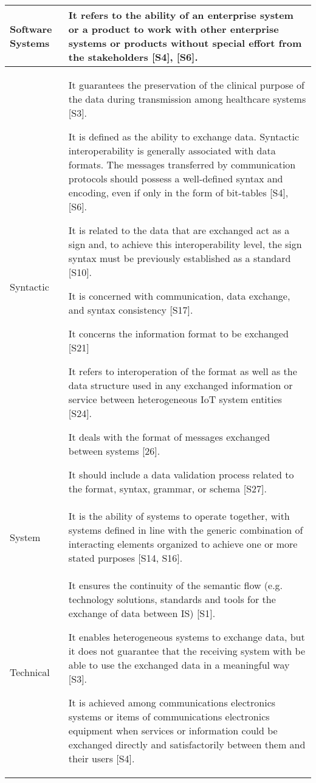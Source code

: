 \begin{longtable}{|p{2.3cm}|p{14cm}|}
    Software Systems & 
    It refers to the ability of an enterprise system or a product to work with other enterprise systems or products without special effort from the stakeholders [S4], [S6].
    \\\hline
    Syntactic & 
    
    It guarantees the preservation of the clinical purpose of the data during transmission among healthcare systems [S3].
    
    It is defined as the ability to exchange data. Syntactic interoperability is generally associated with data formats. The messages transferred by communication protocols should possess a well-defined syntax and encoding, even if only in the form of bit-tables [S4], [S6].
    
    It is related to the data that are exchanged act as a sign and, to achieve this interoperability level, the sign syntax must be previously established as a standard [S10]. 
    
    It is concerned with communication, data exchange, and syntax consistency [S17]. 
    
    It concerns the information format to be exchanged [S21]
    
    It refers to interoperation of the format as well as the data structure used in any exchanged information or service between heterogeneous IoT system entities [S24].
    
    It deals with the format of messages exchanged between systems [26]. 
    
    It should include a data validation process related to the format, syntax, grammar, or schema [S27].
    \\\hline
    System 
    &
    It is the ability of systems to operate together, with systems defined in line with the generic combination of interacting elements organized to achieve one or more stated purposes [S14, S16].
\\\hline
    Technical & 
    
    It ensures the continuity of the  semantic flow (e.g. technology solutions, standards and tools for the exchange of data between IS) [S1].
    
    It enables heterogeneous systems to exchange data, but it does not guarantee that the receiving system with be able to use the exchanged data in a meaningful way [S3].
    
    It is achieved among communications electronics systems or items of communications electronics equipment when services or information could be exchanged directly and satisfactorily between them and their users [S4].
    

\end{longtable}
